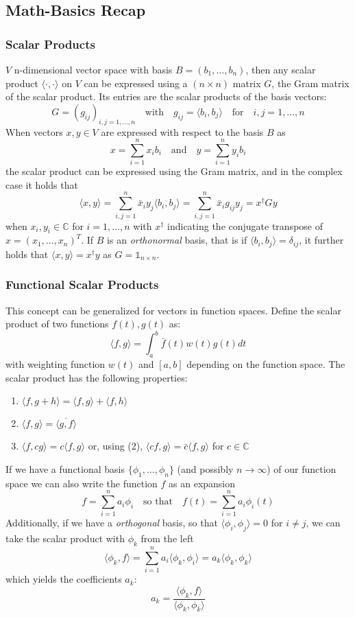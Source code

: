 \subsection{Math-Basics Recap}
\subsubsection{Scalar Products}
$V$ n-dimensional vector space with basis $B = (b_1, \dots, b_n)$, then any scalar product $\langle\cdot,\cdot\rangle$ on $V$ can be expressed using a $(n \times n)$ matrix $G$, the Gram matrix of the scalar product. Its entries are the scalar products of the basis vectors:
$$ G = (g_{ij})_{i,j=1,\dots,n} \quad \text{with} 
  \quad g_{ij} = \langle b_i, b_j \rangle \quad \text{for}
  \quad i,j = 1,\dots, n $$
When vectors $x,y \in V$ are expressed with respect to the basis $B$ as
$$ x = \sum_{i=1}^n x_i b_i \quad \text{and} \quad y = \sum_{i=1}^n y_i b_i $$
the scalar product can be expressed using the Gram matrix, and in the complex case it holds that
$$ \langle x, y \rangle = \sum^n_{i,j=1} \bar{x}_i y_j \langle b_i, b_j \rangle 
  =\sum^n_{i,j=1} \bar{x}_i g_{ij} y_j = x^\dagger G y$$
when $x_i,y_i \in \mathbb{C}$ for $i=1,\dots,n$ with $x^\dagger$ indicating the conjugate transpose of $x = (x_1, \dots, x_n)^T$. If $B$ is an \textit{orthonormal} basis, that is if $\langle b_i, b_j \rangle = \delta_{ij}$, it further holds that $\langle x,y \rangle = x^\dagger y$ as $G = \mathbb{1}_{n \times n}$.


\subsubsection{Functional Scalar Products}
This concept can be generalized for vectors in function spaces. Define the scalar product of two functions $f(t), g(t)$ as:
$$ \langle f, g \rangle = \int_a^b \bar{f}(t) w(t) g(t) dt $$
with weighting function $w(t)$ and $[a,b]$ depending on the function space. The scalar product has the following properties:
\begin{enumerate}
    \item $\langle f, g + h \rangle = \langle f,g \rangle + \langle f,h \rangle$
    \item $\langle f, g \rangle = \overline{\langle g, f \rangle}$
    \item $\langle f, cg \rangle = c \langle f,g \rangle$ or, using (2),
        $\langle cf,g \rangle = \bar{c} \langle f,g \rangle$ for $c \in \mathbb{C}$
\end{enumerate}
If we have a functional basis $\{\phi_1, \dots , \phi_n\}$ (and possibly $n \to \infty$) of our function space we can also write the function $f$ as an expansion
$$ f = \sum_{i=1}^n a_i \phi_i \quad \text{so that} \quad
  f(t) = \sum_{i=1}^n a_i \phi_i (t)$$
Additionally, if we have a \textit{orthogonal} basis, so that $\langle \phi_i, \phi_j \rangle = 0$ for $i \neq j$, we can take the scalar product with $\phi_k$ from the left
$$ \langle \phi_k, f \rangle = \sum_{i=1}^n a_i \langle \phi_k, \phi_i \rangle =
  a_k \langle \phi_k, \phi_k \rangle $$
which yields the coefficients $a_k$: 
$$ a_k = \frac{\langle \phi_k, f \rangle}{\langle \phi_k, \phi_k \rangle}$$

